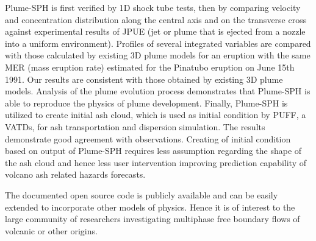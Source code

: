 Plume-SPH is first verified by 1D shock tube tests, then by comparing velocity and concentration distribution along the central axis and on the transverse cross against experimental results of JPUE (jet or plume that is ejected from a nozzle into a uniform environment). 
Profiles of several integrated variables are compared with those calculated by existing 3D plume models for an eruption with the same MER (mass eruption rate) estimated for the Pinatubo eruption on June 15th 1991. Our results are consistent with those obtained by existing 3D plume models. Analysis of the plume evolution process demonstrates that Plume-SPH is able to reproduce the physics of plume development. Finally, Plume-SPH is utilized to create initial ash cloud, which is used as initial condition by PUFF, a VATDs, for ash transportation and dispersion simulation. The results demonstrate good agreement with observations. Creating of initial condition based on output of Plume-SPH requires less assumption regarding the shape of the ash cloud and hence less user intervention improving prediction capability of volcano ash related hazards forecasts.

The documented open source code is publicly available and can be easily extended to incorporate other models of physics. Hence it is of interest to the large community of researchers investigating multiphase free boundary flows of volcanic or other origins.